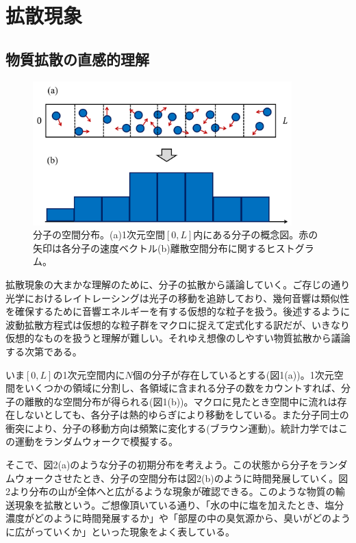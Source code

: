 \documentclass[dvipdfmx, 9pt, a4paper]{jsarticle}
\begin{document}
\section{拡散現象}
\subsection{物質拡散の直感的理解}

\begin{figure}[b]
\begin{center}
\includegraphics[width=10cm]{fig1.png}
\caption{分子の空間分布。(a)1次元空間$[0, L]$内にある分子の概念図。赤の矢印は各分子の速度ベクトル(b)離散空間分布に関するヒストグラム。}
\end{center}
\end{figure}

拡散現象の大まかな理解のために、分子の拡散から議論していく。ご存じの通り光学におけるレイトレーシングは光子の移動を追跡しており、幾何音響は類似性を確保するために音響エネルギーを有する仮想的な粒子を扱う。後述するように波動拡散方程式は仮想的な粒子群をマクロに捉えて定式化する訳だが、いきなり仮想的なものを扱うと理解が難しい。それゆえ想像のしやすい物質拡散から議論する次第である。\par
いま$[0, L]$の1次元空間内に$N$個の分子が存在しているとする(図1(a))。1次元空間をいくつかの領域に分割し、各領域に含まれる分子の数をカウントすれば、分子の離散的な空間分布が得られる(図1(b))。マクロに見たとき空間中に流れは存在しないとしても、各分子は熱的ゆらぎにより移動をしている。また分子同士の衝突により、分子の移動方向は頻繁に変化する(ブラウン運動)。統計力学ではこの運動をランダムウォークで模擬する。\par
そこで、図2(a)のような分子の初期分布を考えよう。この状態から分子をランダムウォークさせたとき、分子の空間分布は図2(b)のように時間発展していく。図2より分布の山が全体へと広がるような現象が確認できる。このような物質の輸送現象を拡散という。ご想像頂いている通り、「水の中に塩を加えたとき、塩分濃度がどのように時間発展するか」や「部屋の中の臭気源から、臭いがどのように広がっていくか」といった現象をよく表している。
\end{document}
